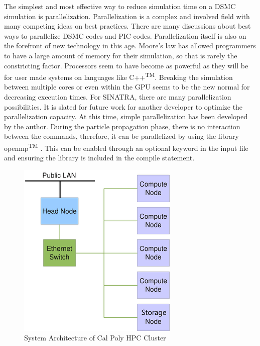 \indent The simplest and most effective way to reduce simulation time on a DSMC simulation is parallelization. Parallelization is a complex and involved field with many competing ideas on best practices. There are many discussions about best ways to parallelize DSMC codes and PIC codes. Parallelization itself is also on the forefront of new technology in this age. Moore’s law has allowed programmers to have a large amount of memory for their simulation, so that is rarely the constricting factor. Processors seem to have become as powerful as they will be for user made systems on languages like C++\textsuperscript{TM}. Breaking the simulation between multiple cores or even within the GPU seems to be the new normal for decreasing execution times. For SINATRA, there are many parallelization possibilities. It is slated for future work for another developer to optimize the parallelization capacity. At this time, simple parallelization has been developed by the author. During the particle propagation phase, there is no interaction between the commands, therefore, it can be parallelized by using the library openmp\textsuperscript{TM} \cite{openmp}. This can be enabled through an optional keyword in the input file and ensuring the library is included in the compile statement. \par

\begin{figure}
\includegraphics[width=.65\textwidth]{figures/HPC_cluster.png}
\centering
\caption{System Architecture of Cal Poly HPC Cluster\cite{hpc}}
\label{fig:hpccluser}
\end{figure}

